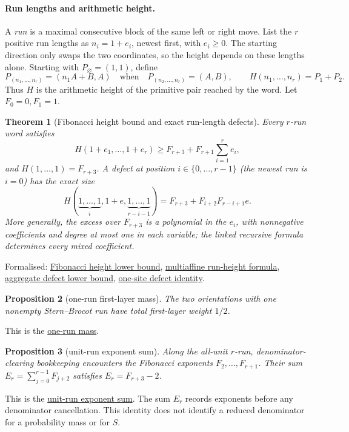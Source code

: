 \documentclass[11pt]{article}
\newcommand{\commit}{bb4e24651b37cd096d3749ef299c3317930b3a3b}
\newcommand{\repobase}{https://github.com/wcook04/plectis-lean-erdos249-257/blob/\commit}
\newcommand{\PK}{Erdos249257}
\newcommand{\lword}[4]{\href{\repobase/\PK/#1\#L#2}{#4}}
\newtheorem{theorem}{Theorem}[section]
\newtheorem{proposition}[theorem]{Proposition}
\theoremstyle{definition}
\theoremstyle{remark}
\begin{document}
{\paragraph{Run lengths and arithmetic height.}
A \emph{run} is a maximal consecutive block of the same left or right move.
List the $r$ positive run lengths as $n_i=1+e_i$, newest first, with $e_i\ge0$.
The starting direction only swaps the two coordinates, so the height depends
on these lengths alone.  Starting with \(P_\varnothing=(1,1)\), define
\[
  P_{(n_1,\ldots,n_r)}=(n_1A+B,A)
  \quad\text{when}\quad P_{(n_2,\ldots,n_r)}=(A,B),
  \qquad H(n_1,\ldots,n_r)=P_1+P_2.
\]
Thus \(H\) is the arithmetic height of the primitive pair reached by the
word.  Let \(F_0=0,F_1=1\).

\begin{theorem}[Fibonacci height bound and exact run-length defects]
\label{res:sternbrocotruns}
Every \(r\)-run word satisfies
\[
 H(1+e_1,\ldots,1+e_r)
 \ge F_{r+3}+F_{r+1}\sum_{i=1}^r e_i,
\]
and \(H(1,\ldots,1)=F_{r+3}\).  A defect at position
\(i\in\{0,\ldots,r-1\}\) (the newest run is $i=0$) has the exact size
\[
 H(\underbrace{1,\ldots,1}_{i},1+e,
   \underbrace{1,\ldots,1}_{r-i-1})
 =F_{r+3}+F_{i+2}F_{r-i+1}e.
\]
More generally, the excess over $F_{r+3}$ is a polynomial in the $e_i$, with
nonnegative coefficients and degree at most one in each variable; the linked
recursive formula determines every mixed coefficient.
\end{theorem}
\noindent Formalised:
\lword{SternBrocotRunGeometry.lean}{185}{runHeight_fib_lower}{Fibonacci height lower bound},
\lword{SternBrocotRunGeometry.lean}{263}{runHeight_defectRunLengths}{multiaffine run-height formula},
\lword{SternBrocotRunGeometry.lean}{343}{runHeight_defect_fib_sum_lower}{aggregate defect lower bound},
\lword{SternBrocotRunGeometry.lean}{413}{runHeight_oneSiteDefect}{one-site defect identity}.

\begin{proposition}[one-run first-layer mass]\label{res:onerunmass}
The two orientations with one nonempty Stern--Brocot run have total
first-layer weight $1/2$.
\end{proposition}
\noindent This is the
\lword{SternBrocotRunGeometry.lean}{467}{oneRunMass_eq_half}{one-run mass}.

\begin{proposition}[unit-run exponent sum]\label{res:rundenominator}
Along the all-unit $r$-run, denominator-clearing bookkeeping encounters the
Fibonacci exponents $F_2,\ldots,F_{r+1}$.  Their sum
$E_r=\sum_{j=0}^{r-1}F_{j+2}$ satisfies \(E_r=F_{r+3}-2\).
\end{proposition}
\noindent This is the
\lword{SternBrocotRunGeometry.lean}{491}{naturalRunDenominatorExponent_add_two}{unit-run exponent sum}.
The sum $E_r$ records exponents before any denominator cancellation.  This
identity does not identify a reduced denominator for a probability mass or
for \(S\).

}
\end{document}
